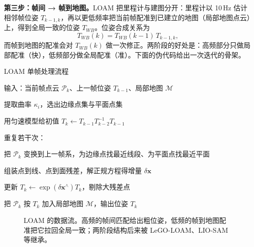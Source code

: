 \textbf{第三步：帧间 → 帧到地图。}LOAM 把里程计与建图分开：里程计以 10\,Hz 估计相邻帧位姿 $T_{k-1,k}$，再以更低频率把当前帧配准到已建立的地图（局部地图点云）上，得到全局一致的位姿 $T_{WB}$。位姿合成关系为
\begin{equation}
  T_{WB}(k) = T_{WB}(k-1)\,T_{k-1,k},
  \label{eq:07-pose-compose}
\end{equation}
而帧到地图的配准会对 $T_{WB}(k)$ 做一次修正。两阶段的好处是：高频部分只做局部配准（快），低频部分做全局配准（准）。下面的伪代码给出一次迭代的骨架。

\begin{pseudo}{LOAM 单帧处理流程}
  \item 输入：当前帧点云 $\mathcal{P}_k$、上一帧位姿 $T_{k-1}$、局部地图 $\mathcal{M}$
  \item 提取曲率 $\kappa_i$，选出边缘点集与平面点集
  \item 用匀速模型给初值 $T_k\leftarrow T_{k-1}T_{k-2}^{-1}T_{k-1}$
  \item 重复若干次：
  \item \quad 把 $\mathcal{P}_k$ 变换到上一帧系，为边缘点找最近线段、为平面点找最近平面
  \item \quad 组装点到线、点到面残差，解正规方程得增量 $\delta\bm{x}$
  \item \quad 更新 $T_k\leftarrow\exp(\delta\bm{x}^{\wedge})T_k$，剔除大残差点
  \item 把 $\mathcal{P}_k$ 按 $T_k$ 加入局部地图 $\mathcal{M}$，输出位姿 $T_k$
\end{pseudo}

\begin{figure}[htbp]
  \centering
  \caption{LOAM 的数据流。高频的帧间匹配给出粗位姿，低频的帧到地图配准把它拉回全局一致；两阶段结构后来被 LeGO-LOAM、LIO-SAM 等继承。}
  \label{fig:07-loam}
\end{figure}


